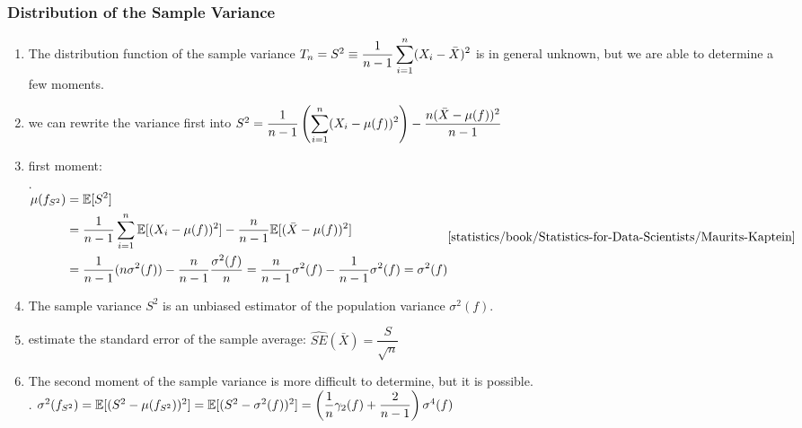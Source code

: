 \subsubsection{Distribution of the Sample Variance}

\begin{enumerate}
    \item The distribution function of the sample variance $T_n = S^2 \equiv \dfrac{1}{n - 1} \displaystyle\sum ^n _{i=1}(X _i - \bar{X})^2$ is in general unknown, but we are able to determine a few moments.
    \hfill \cite{statistics/book/Statistics-for-Data-Scientists/Maurits-Kaptein}

    \item we can rewrite the variance first into
    $S^2 = \dfrac{1}{n - 1} \left(\displaystyle\sum^n _{i=1} (X _i - \mu ( f ))^2\right) - \dfrac{n( \bar{X} - \mu ( f ))^2}{n - 1}$
    \hfill \cite{statistics/book/Statistics-for-Data-Scientists/Maurits-Kaptein}

    \item first moment:
    \\[0.2cm]
    .\hfill
    $
        \begin{aligned}
            \mu  ( f _{S^2} )
            & = \mbbE[S^2] \\
            &= \dfrac{1}{n-1} \dsum^n _{i=1} \mbbE[(X _i - \mu ( f ))^2] - \dfrac{n}{n-1} \mbbE[( \bar{X} - \mu ( f ))^2] \\
            &= \dfrac{1}{n-1} (n\sigma ^ 2( f )) - \dfrac{n }{n-1} \dfrac{\sigma  ^2( f )}{n}
            = \dfrac{n}{n-1} \sigma ^ 2( f ) - \dfrac{1 }{n-1} \sigma  ^2( f )
            = \sigma ^2( f )
        \end{aligned}
        \hfill \text{\cite{statistics/book/Statistics-for-Data-Scientists/Maurits-Kaptein}}
    $

    \item The sample variance $S^2$ is an unbiased estimator of the population variance $\sigma ^2( f )$.
    \hfill \cite{statistics/book/Statistics-for-Data-Scientists/Maurits-Kaptein}

    \item estimate the standard error of the sample average: $\hat{SE}(\bar{X}) = \dfrac{S}{\sqrt{n}}$
    \hfill \cite{statistics/book/Statistics-for-Data-Scientists/Maurits-Kaptein}

    \item The second moment of the sample variance is more difficult to determine, but it is possible.
    \hfill \cite{statistics/book/Statistics-for-Data-Scientists/Maurits-Kaptein}
    \\[0.2cm]
    .\hfill
    $
        \sigma  ^2 ( f _{S^2} )
        = \mathbb{E}[(S^2 - \mu ( f _{S^2} ))^2 ]
        = \mathbb{E}[(S^2 - \sigma  ^2 ( f ))^2]
        = \left(\dfrac{1}{n} \gamma_2 ( f ) + \dfrac{2}{n - 1}\right) \sigma  ^4 ( f )
    $
    \hfill \cite{statistics/book/Statistics-for-Data-Scientists/Maurits-Kaptein}


\end{enumerate}
